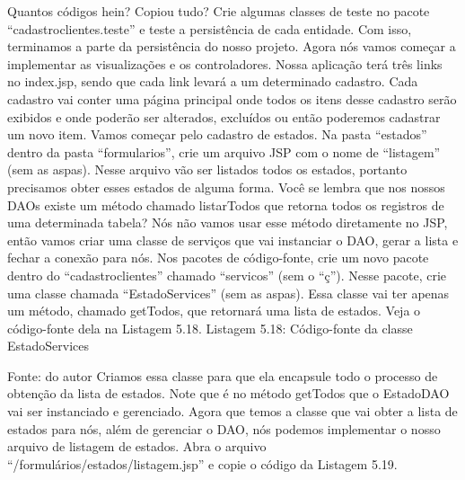 Quantos códigos hein? Copiou tudo? Crie algumas classes de teste no pacote ``cadastroclientes.teste'' e teste a persistência de cada entidade. Com isso, terminamos a parte da persistência do nosso projeto.
Agora nós vamos começar a implementar as visualizações e os controladores. Nossa aplicação terá três links no index.jsp, sendo que cada link levará a um determinado cadastro. Cada cadastro vai conter uma página principal onde todos os itens desse cadastro serão exibidos e onde poderão ser alterados, excluídos ou então poderemos cadastrar um novo item.
Vamos começar pelo cadastro de estados. Na pasta ``estados'' dentro da pasta ``formularios'', crie um arquivo JSP com o nome de ``listagem'' (sem as aspas). Nesse arquivo vão ser listados todos os estados, portanto precisamos obter esses estados de alguma forma. Você se lembra que nos nossos DAOs existe um método chamado listarTodos que retorna todos os registros de uma determinada tabela? Nós não vamos usar esse método diretamente no JSP, então vamos criar uma classe de serviços que vai instanciar o DAO, gerar a lista e fechar a conexão para nós. Nos pacotes de código-fonte, crie um novo pacote dentro do ``cadastroclientes'' chamado ``servicos'' (sem o ``ç''). Nesse pacote, crie uma classe chamada ``EstadoServices'' (sem as aspas). Essa classe vai ter apenas um método, chamado getTodos, que retornará uma lista de estados. Veja o código-fonte dela na Listagem 5.18.
Listagem 5.18: Código-fonte da classe EstadoServices
 
Fonte: do autor
Criamos essa classe para que ela encapsule todo o processo de obtenção da lista de estados. Note que é no método getTodos que o EstadoDAO vai ser instanciado e gerenciado.
Agora que temos a classe que vai obter a lista de estados para nós, além de gerenciar o DAO, nós podemos implementar o nosso arquivo de listagem de estados. Abra o arquivo ``/formulários/estados/listagem.jsp'' e copie o código da Listagem 5.19.



